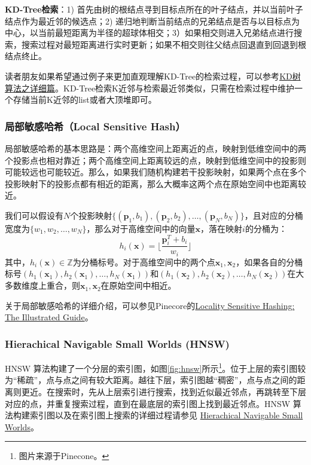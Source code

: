 \documentclass[lang=cn,newtx,10pt,scheme=chinese,color=black]{elegantbook}
\begin{document}
\textcolor{importcolor}{\bfseries KD-Tree检索}：1) 首先由树的根结点寻到目标点所在的叶子结点，并以当前叶子结点作为最近邻的候选点；2) 递归地判断当前结点的兄弟结点是否与以目标点为中心，以当前最短距离为半径的超球体相交；3）如果相交则进入兄弟结点进行搜索，搜索过程对最短距离进行实时更新；如果不相交则往父结点回退直到回退到根结点终止。

\begin{note}
  读者朋友如果希望通过例子来更加直观理解KD-Tree的检索过程，可以参考\href{https://zhuanlan.zhihu.com/p/23966698}{KD树算法之详细篇}。KD-Tree检索K近邻与检索最近邻类似，只需在检索过程中维护一个存储当前K近邻的list或者大顶堆即可。
\end{note}

\subsubsection{局部敏感哈希（Local Sensitive Hash）}

局部敏感哈希的基本思路是：两个高维空间上距离近的点，映射到低维空间中的两个投影点也相对靠近；两个高维空间上距离较远的点，映射到低维空间中的投影则可能较远也可能较近。那么，如果我们随机构建若干投影映射，如果两个点在多个投影映射下的投影点都有相近的距离，那么大概率这两个点在原始空间中也距离较近。

我们可以假设有$N$个投影映射$\{(\bm{p}_1,b_1),(\bm{p}_2,b_2),\dots,(\bm{p}_N, b_N)\}$，且对应的分桶宽度为$\{w_1,w_2,\dots,w_N\}$，那么对于高维空间中的向量$\bm{x}$，落在映射$i$的分桶为：
\begin{equation}
  h_i(\bm{x})= \lfloor \frac{\bm{p}_i^T + b_i}{w_i} \rfloor
\end{equation}
其中，$h_i(\bm{x})\in \mathbb{Z}$为分桶标号。对于高维空间中的两个点$\bm{x}_1,\bm{x}_2$，如果各自的分桶标号$(h_1(\bm{x}_1), h_2(\bm{x}_1),\dots,h_N(\bm{x}_1))$和$(h_1(\bm{x}_2), h_2(\bm{x}_2),\dots,h_N(\bm{x}_2))$在大多数维度上重合，则$\bm{x}_1,\bm{x}_2$在原始空间中相近。

\begin{note}
  关于局部敏感哈希的详细介绍，可以参见Pinecore的\href{https://www.pinecone.io/learn/series/faiss/locality-sensitive-hashing/}{Locality Sensitive Hashing: The Illustrated Guide}。
\end{note}

\subsubsection{Hierachical Navigable Small Worlds (HNSW)}

HNSW 算法构建了一个分层的索引图，如图\ref{fig:hnsw}所示\footnote{图片来源于Pinecone。}。位于上层的索引图较为“稀疏”，点与点之间有较大距离。越往下层，索引图越“稠密”，点与点之间的距离则更近。在搜索时，先从上层索引进行搜索，找到近似最近邻点，再跳转至下层对应的点，并重复搜索过程，直到在最底层的索引图上找到最近邻点。HNSW 算法构建索引图以及在索引图上搜索的详细过程请参见 \href{https://www.pinecone.io/learn/series/faiss/hnsw/}{Hierachical Navigable Small Worlds}。
\end{document}
